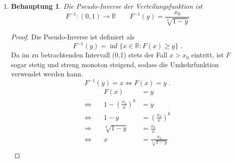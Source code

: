 \documentclass[a4paper]{scrartcl}
\newtheorem*{behaupt}{Behauptung}
\newcommand{\gdw}{\Leftrightarrow}
\def \blattnr {11}
\begin{document}
\begin{enumerate}[label=\bfseries \blattnr.\arabic*]
\begin{enumerate}
            \item
                \begin{behaupt}
                    Die Pseudo-Inverse der Verteilungsfunktion ist
                    \begin{equation*}
                        F^{-1}\colon (0,1) \to \mathbb{R}
                        \qquad
                        F^{-1}(y) = \frac{x_0}{\sqrt[k]{1-y}}
                    \end{equation*}
                \end{behaupt}
                \begin{proof}
                    Die Pseudo-Inverse ist definiert als
                    \begin{equation*}
                        F^{-1}(y)
                        = \inf \{ x \in \mathbb{R} : F(x) \geq y \}
                        \text{ .}
                    \end{equation*}
                    Da im zu betrachtenden Intervall (0,1) stets 
                    der Fall $x>x_0$ eintritt, ist $F$ sogar stetig und 
                    streng monoton steigend, sodass die Umkehrfunktion 
                    verwendet werden kann.
                    \begin{equation*}
                        F^{-1}(y) = x
                        \gdw
                        F(x) = y
                        \text{ .}
                    \end{equation*}
                    \begin{equation*}
                        \begin{alignedat}{2}
                            && F(x) &= y \\
                            \gdw\ && 1 - \left( \frac{x_0}{x} \right)^k  &= y \\
                            \gdw\ && 1 - y  &= \left( \frac{x_0}{x} \right)^k \\
                            \Rightarrow\ && \sqrt[k]{1 - y}  &= \frac{x_0}{x} \\
                            \gdw\ && x &= \frac{x_0}{\sqrt[k]{1 - y}} \\
                        \end{alignedat}
                    \end{equation*}
                \end{proof}


\end{enumerate}
\end{enumerate}
\end{document}
